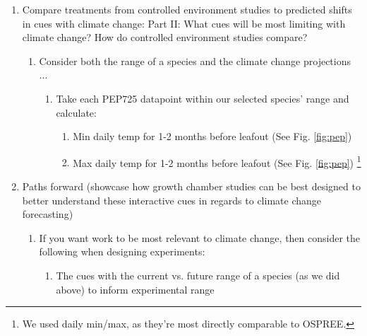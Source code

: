 \documentclass[11pt,letterpaper]{article}
\begin{document}
\begin{enumerate}
\begin{enumerate}
\begin{enumerate}
\end{enumerate}
\item X\% of studies manipulated which interacting cues? (i.e., how many studies manipulate 1 cues, 2 cues, 3 cues ... of those manipulating 1 cue, what is the breakdown by cue etc.) ... 43\% manipulated forcing and photo, only 10\% manipulated chilling and forcing or photo (9\% for chill x photo; 10\% for chill x force), see Fig. \ref{fig:heatmaps}
\end{enumerate}
\item Compare treatments from controlled environment studies to predicted shifts in cues with climate change: Part II: What cues will be most limiting with climate change? How do controlled environment studies compare? 
\begin{enumerate}
\item Consider both the range of a species and the climate change projections ...
\begin{enumerate}
\item Take each PEP725 datapoint within our selected species' range and calculate:
\begin{enumerate}
\item Min daily temp for 1-2 months before leafout (See Fig. \ref{fig:pep})
\item Max daily temp for 1-2 months before leafout (See Fig. \ref{fig:pep}) \footnote{We used daily min/max, as they're most directly comparable to OSPREE.}
\end{enumerate}
\end{enumerate}
\end{enumerate}
\item Paths forward (showcase how growth chamber studies can be best designed to better understand these interactive cues in regards to climate change forecasting) 
\begin{enumerate}
\item If you want work to be most relevant to climate change, then consider the following when designing experiments:
\begin{enumerate}
\item The cues with the current vs. future range of a species (as we did above) to inform experimental range %

\end{enumerate}
\end{enumerate}
\end{enumerate}
\end{document}
